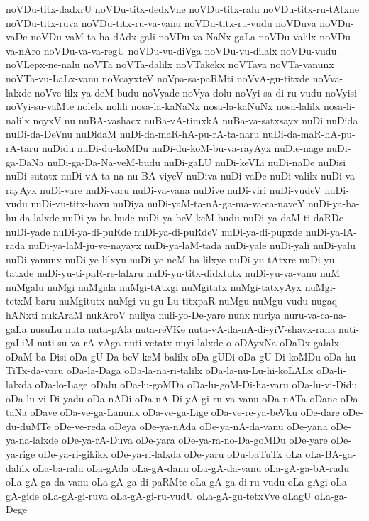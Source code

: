 {noVDu-titx-dadxrU
noVDu-titx-dedxVne
noVDu-titx-ralu
noVDu-titx-ru-tAtxne
noVDu-titx-ruva
noVDu-titx-ru-va-vanu
noVDu-titx-ru-vudu
noVDuva
noVDu-vaDe
noVDu-vaM-ta-ha-dAdx-gali
noVDu-va-NaNx-gaLa
noVDu-valilx
noVDu-va-nAro
noVDu-va-va-regU
noVDu-vu-diVga
noVDu-vu-dilalx
noVDu-vudu
noVLepx-ne-nalu
noVTa
noVTa-dalilx
noVTakekx
noVTava
noVTa-vanunx
noVTa-vu-LaLx-vanu
noVcayxteV
noVpa-sa-paRMti
noVvA-gu-titxde
noVva-lalxde
noVve-lilx-ya-deM-budu
noVyade
noVya-dolu
noVyi-sa-di-ru-vudu
noVyisi
noVyi-su-vaMte
nolelx
nolili
nosa-la-kaNaNx
nosa-la-kaNuNx
nosa-lalilx
nosa-li-nalilx
noyxV
nu
nuBA-vashacx
nuBa-vA-timxkA
nuBa-va-satxsayx
nuDi
nuDida
nuDi-da-DeVnu
nuDidaM
nuDi-da-maR-hA-pu-rA-ta-naru
nuDi-da-maR-hA-pu-rA-taru
nuDidu
nuDi-du-koMDu
nuDi-du-koM-bu-va-rayAyx
nuDie-nage
nuDi-ga-DaNa
nuDi-ga-Da-Na-veM-budu
nuDi-gaLU
nuDi-keVLi
nuDi-naDe
nuDisi
nuDi-sutatx
nuDi-vA-ta-na-nu-BA-viyeV
nuDiva
nuDi-vaDe
nuDi-valilx
nuDi-va-rayAyx
nuDi-vare
nuDi-varu
nuDi-va-vana
nuDive
nuDi-viri
nuDi-vudeV
nuDi-vudu
nuDi-vu-titx-havu
nuDiya
nuDi-yaM-ta-nA-ga-ma-va-ca-naveY
nuDi-ya-ba-hu-da-lalxde
nuDi-ya-ba-hude
nuDi-ya-beV-keM-budu
nuDi-ya-daM-ti-daRDe
nuDi-yade
nuDi-ya-di-puRde
nuDi-ya-di-puRdeV
nuDi-ya-di-pupxde
nuDi-ya-lA-rada
nuDi-ya-laM-ju-ve-nayayx
nuDi-ya-laM-tada
nuDi-yale
nuDi-yali
nuDi-yalu
nuDi-yanunx
nuDi-ye-lilxyu
nuDi-ye-neM-ba-lilxye
nuDi-yu-tAtxre
nuDi-yu-tatxde
nuDi-yu-ti-paR-re-lalxru
nuDi-yu-titx-didxtutx
nuDi-yu-va-vanu
nuM
nuMgalu
nuMgi
nuMgida
nuMgi-tAtxgi
nuMgitatx
nuMgi-tatxyAyx
nuMgi-tetxM-baru
nuMgitutx
nuMgi-vu-gu-Lu-titxpaR
nuMgu
nuMgu-vudu
nugaq-hANxti
nukAraM
nukAroV
nuliya
nuli-yo-De-yare
nunx
nuriya
nuru-va-ca-na-gaLa
nusuLu
nuta
nuta-pAla
nuta-reVKe
nuta-vA-da-nA-di-yiV-shavx-rana
nuti-gaLiM
nuti-su-va-rA-vAga
nuti-vetatx
nuyi-lalxde
o
oDAyxNa
oDaDx-galalx
oDaM-ba-Disi
oDa-gU-Da-beV-keM-balilx
oDa-gUDi
oDa-gU-Di-koMDu
oDa-hu-TiTx-da-varu
oDa-la-Daga
oDa-la-na-ri-talilx
oDa-la-nu-Lu-hi-koLALx
oDa-li-lalxda
oDa-lo-Lage
oDalu
oDa-lu-goMDa
oDa-lu-goM-Di-ha-varu
oDa-lu-vi-Didu
oDa-lu-vi-Di-yadu
oDa-nADi
oDa-nA-Di-yA-gi-ru-va-vanu
oDa-nATa
oDane
oDa-taNa
oDave
oDa-ve-ga-Lanunx
oDa-ve-ga-Lige
oDa-ve-re-ya-beVku
oDe-dare
oDe-du-duMTe
oDe-ve-reda
oDeya
oDe-ya-nAda
oDe-ya-nA-da-vanu
oDe-yana
oDe-ya-na-lalxde
oDe-ya-rA-Duva
oDe-yara
oDe-ya-ra-no-Da-goMDu
oDe-yare
oDe-ya-rige
oDe-ya-ri-gikikx
oDe-ya-ri-lalxda
oDe-yaru
oDu-baTuTx
oLa
oLa-BA-ga-dalilx
oLa-ba-ralu
oLa-gAda
oLa-gA-danu
oLa-gA-da-vanu
oLa-gA-ga-bA-radu
oLa-gA-ga-da-vanu
oLa-gA-ga-di-paRMte
oLa-gA-ga-di-ru-vudu
oLa-gAgi
oLa-gA-gide
oLa-gA-gi-ruva
oLa-gA-gi-ru-vudU
oLa-gA-gu-tetxVve
oLagU
oLa-ga-Dege
}
